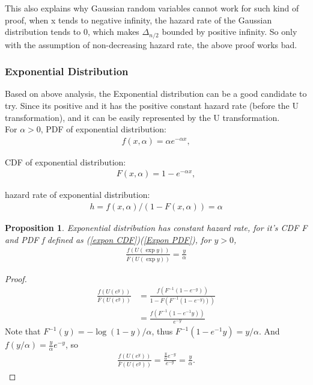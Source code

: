 \documentclass{article}
\theoremstyle{plain}
\newtheorem{prop}{Proposition}
\begin{document}
This also explains why Gaussian random variables cannot work for such kind of proof, when x tends to negative infinity, the hazard rate of the Gaussian distribution tends to 0, which makes $\Delta_{n/2}$ bounded by positive infinity. So only with the assumption of non-decreasing hazard rate, the above proof works bad. 
\subsubsection{Exponential Distribution}

Based on above analysis, the Exponential distribution can be a good candidate to try. Since its positive and it has the positive constant hazard rate (before the U transformation), and it can be easily represented by the U transformation.\\

For $\alpha > 0$, PDF of exponential distribution:
\begin{align}
\label{Expon PDF}
    f(x, \alpha) = \alpha e^{-\alpha x},
\end{align}

CDF of exponential distribution:
\begin{align}
\label{expon CDF}
    F(x, \alpha) = 1 - e^{-\alpha x},
\end{align}

hazard rate of exponential distribution:
\begin{align}
 h = f(x, \alpha)/ (1-F(x, \alpha)) = \alpha
\end{align}

\begin{prop}
\label{prop for expon hazard rate}
Exponential distribution has constant hazard rate, for it's CDF F and PDF f defined as (\ref{expon CDF})(\ref{Expon PDF}), for $y > 0$,
\begin{align}
    \frac{f(U(\exp{y}))}{\bar{F}(U(\exp{y}))} = \frac{y}{\alpha}
\end{align}
\end{prop}

\begin{proof}
\begin{align}
    \frac{f(U(e^{y}))}{\bar{F}(U(e^{y}))} &=
    \frac{f(F^{-1}(1 - e^{-y}))}{1-F\left({F}^{-1}\left(1 - e^{-y})\right)\right)}\\
    &= \frac{f(F^{-1}(1 - e^{-1}{y}))}{e^{-y}}
\end{align}
Note that $F^{-1}(y) = - \log (1 - y)/ \alpha$, thus $F^{-1}(1 - e^{-1}{y}) = y/ \alpha$. And $f(y/\alpha) = \frac{y}{\alpha} e^{-y}$,
so 
\begin{align}
    \frac{f(U(e^{y}))}{\bar{F}(U(e^{y}))} = \frac{\frac{y}{\alpha} e^{-y}}{e^{-y}} = \frac{y}{\alpha}.
\end{align}
 
\end{proof}
\end{document}
